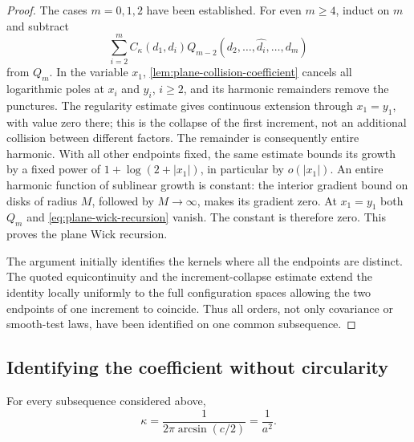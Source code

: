 \begin{proof}
The cases \(m=0,1,2\) have been established. For even \(m\ge4\), induct
on \(m\) and subtract
\begin{equation}
 \sum_{i=2}^m C_\kappa(d_1,d_i)
                 Q_{m-2}(d_2,\ldots,\widehat{d_i},\ldots,d_m)
 \label{eq:plane-wick-recursion}
\end{equation}
from $Q_m$. In the variable $x_1$,
\cref{lem:plane-collision-coefficient} cancels all logarithmic poles at
$x_i$ and $y_i$, $i\geq2$, and its harmonic remainders remove the
punctures. The regularity estimate gives continuous extension through
$x_1=y_1$, with
value zero there; this is the collapse of the first increment,
not an additional collision between different factors. The
remainder is consequently entire harmonic. With all other
endpoints fixed, the same estimate bounds its growth by a fixed
power of $1+\log(2+|x_1|)$, in particular by $o(|x_1|)$.
An entire harmonic function of sublinear growth is constant:
the interior gradient bound on disks of radius $M$, followed
by $M\to\infty$, makes its gradient zero. At $x_1=y_1$ both
$Q_m$ and \eqref{eq:plane-wick-recursion} vanish. The constant
is therefore zero. This proves the plane Wick recursion.

The argument initially identifies the kernels where all the
endpoints are distinct. The quoted equicontinuity and the
increment-collapse estimate extend the identity locally
uniformly to the full configuration spaces allowing the two
endpoints of one increment to coincide. Thus all orders, not
only covariance or smooth-test laws, have been identified on
one common subsequence.
\end{proof}

\subsection{Identifying the coefficient without circularity}

\begin{proposition}
\label{prop:plane-normalization}
For every subsequence considered above,
\begin{equation}
 \kappa=\frac1{2\pi\arcsin(c/2)}=\frac1{a^2}.
 \label{eq:identified-kappa}
\end{equation}
\end{proposition}

